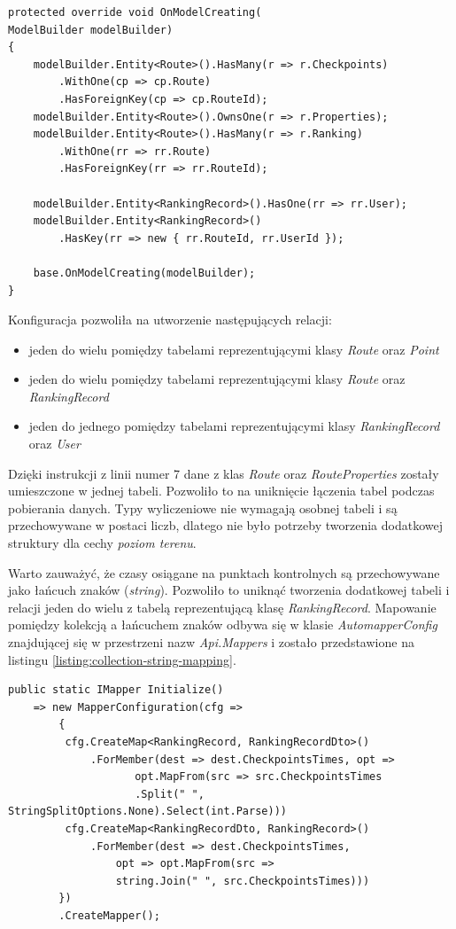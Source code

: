 \begin{lstlisting}[caption={Konfiguracja mapowania relacyjno-obiektowego},label=listing:context]
protected override void OnModelCreating(
ModelBuilder modelBuilder)
{
    modelBuilder.Entity<Route>().HasMany(r => r.Checkpoints)
    	.WithOne(cp => cp.Route)
    	.HasForeignKey(cp => cp.RouteId);
    modelBuilder.Entity<Route>().OwnsOne(r => r.Properties);
    modelBuilder.Entity<Route>().HasMany(r => r.Ranking)
    	.WithOne(rr => rr.Route)
        .HasForeignKey(rr => rr.RouteId);

    modelBuilder.Entity<RankingRecord>().HasOne(rr => rr.User);
    modelBuilder.Entity<RankingRecord>()
    	.HasKey(rr => new { rr.RouteId, rr.UserId });

    base.OnModelCreating(modelBuilder);
}
\end{lstlisting}
Konfiguracja pozwoliła na utworzenie następujących relacji:
\begin{itemize}
\item{jeden do wielu pomiędzy tabelami reprezentującymi klasy \textit{Route}} oraz \textit{Point}
\item{jeden do wielu pomiędzy tabelami reprezentującymi klasy \textit{Route}} oraz \textit{RankingRecord}
\item{jeden do jednego pomiędzy tabelami reprezentującymi klasy \textit{RankingRecord} oraz \textit{User}}
\end{itemize}
Dzięki instrukcji z linii numer 7 dane z klas \textit{Route} oraz \textit{RouteProperties} zostały umieszczone w jednej tabeli. Pozwoliło to na uniknięcie łączenia tabel podczas pobierania danych. Typy wyliczeniowe nie wymagają osobnej tabeli i są przechowywane w postaci liczb, dlatego nie było potrzeby tworzenia dodatkowej struktury dla cechy \textit{poziom terenu}.

Warto zauważyć, że czasy osiągane na punktach kontrolnych są przechowywane jako łańcuch znaków (\textit{string}). Pozwoliło to uniknąć tworzenia dodatkowej tabeli i relacji jeden do wielu z tabelą reprezentującą klasę \textit{RankingRecord}. Mapowanie pomiędzy kolekcją a łańcuchem znaków odbywa się w klasie \textit{AutomapperConfig} znajdującej się w przestrzeni nazw \textit{Api.Mappers} i zostało przedstawione na listingu \ref{listing:collection-string-mapping}.
\begin{lstlisting}[caption={Mapowanie pomiedzy kolekcją a łańcuchem znaków},label=collection-string-mapping]
public static IMapper Initialize()
    => new MapperConfiguration(cfg =>
        {
         cfg.CreateMap<RankingRecord, RankingRecordDto>()
             .ForMember(dest => dest.CheckpointsTimes, opt =>
                    opt.MapFrom(src => src.CheckpointsTimes
                    .Split(" ", StringSplitOptions.None).Select(int.Parse)))
         cfg.CreateMap<RankingRecordDto, RankingRecord>()
             .ForMember(dest => dest.CheckpointsTimes,
                 opt => opt.MapFrom(src => 
                 string.Join(" ", src.CheckpointsTimes)))
        })
        .CreateMapper();
\end{lstlisting}

